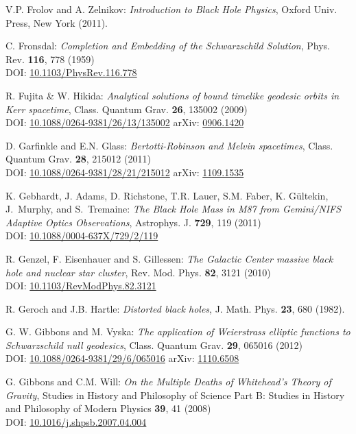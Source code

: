 \begin{thebibliography}{123}
V.P. Frolov and A. Zelnikov: {\em Introduction to Black Hole Physics},
Oxford Univ. Press, New York (2011).

C. Fronsdal: {\em Completion and Embedding of the Schwarzschild Solution},
Phys. Rev. {\bf 116}, 778 (1959) \\
DOI: \href{https://doi.org/10.1103/PhysRev.116.778}{10.1103/PhysRev.116.778}

R. Fujita \& W. Hikida:
{\em Analytical solutions of bound timelike geodesic orbits in Kerr spacetime},
Class. Quantum Grav. {\bf 26}, 135002 (2009) \\
DOI: \href{https://doi.org/10.1088/0264-9381/26/13/135002}{10.1088/0264-9381/26/13/135002}\hfill
arXiv: \href{https://arxiv.org/abs/0906.1420}{0906.1420}

D. Garfinkle and E.N. Glass:
{\em Bertotti-Robinson and Melvin spacetimes},
Class. Quantum Grav. {\bf 28}, 215012 (2011)\\
DOI: \href{https://doi.org/10.1088/0264-9381/28/21/215012}{10.1088/0264-9381/28/21/215012}\hfill
arXiv: \href{https://arxiv.org/abs/1109.1535}{1109.1535}

K. Gebhardt, J. Adams, D. Richstone, T.R. Lauer, S.M. Faber, K. Gültekin, J.~Murphy, and S.~Tremaine:
{\em The Black Hole Mass in M87 from Gemini/NIFS Adaptive Optics Observations},
Astrophys. J. {\bf 729}, 119 (2011)\\
DOI: \href{https://doi.org/10.1088/0004-637X/729/2/119}{10.1088/0004-637X/729/2/119}

R. Genzel, F. Eisenhauer and S. Gillessen:
{\em The Galactic Center massive black hole and nuclear star cluster},
Rev. Mod. Phys. {\bf 82}, 3121 (2010)\\
DOI: \href{https://doi.org/10.1103/RevModPhys.82.3121}{10.1103/RevModPhys.82.3121}

R. Geroch and J.B. Hartle: {\em Distorted black holes},
J. Math. Phys. {\bf 23}, 680 (1982).

G. W. Gibbons and M. Vyska:
{\em The application of Weierstrass elliptic functions to Schwarzschild null geodesics},
Class. Quantum Grav. {\bf 29}, 065016 (2012)\\
DOI: \href{https://doi.org/10.1088/0264-9381/29/6/065016}{10.1088/0264-9381/29/6/065016}\hfill
arXiv: \href{https://arxiv.org/abs/1110.6508}{1110.6508}

G. Gibbons and C.M. Will: {\em On the Multiple Deaths of Whitehead's Theory of Gravity},
Studies in History and Philosophy of Science Part B: Studies in History and Philosophy of Modern Physics {\bf 39}, 41 (2008)\\
DOI: \href{https://doi.org/10.1016/j.shpsb.2007.04.004}{10.1016/j.shpsb.2007.04.004}


\end{thebibliography}
